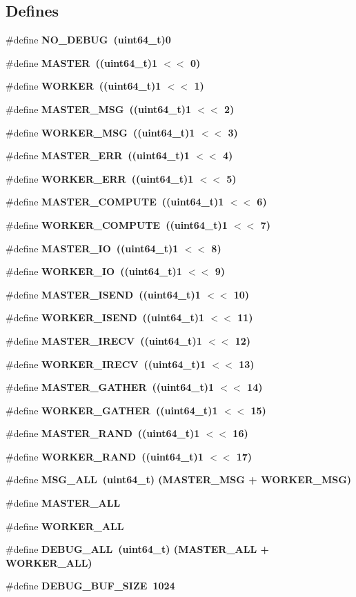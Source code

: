 \subsection*{Defines}
\begin{CompactItemize}
\item 
\#define \bf{NO\_\-DEBUG}~(uint64\_\-t)0
\item 
\#define \bf{MASTER}~((uint64\_\-t)1 $<$$<$ 0)
\item 
\#define \bf{WORKER}~((uint64\_\-t)1 $<$$<$ 1)
\item 
\#define \bf{MASTER\_\-MSG}~((uint64\_\-t)1 $<$$<$ 2)
\item 
\#define \bf{WORKER\_\-MSG}~((uint64\_\-t)1 $<$$<$ 3)
\item 
\#define \bf{MASTER\_\-ERR}~((uint64\_\-t)1 $<$$<$ 4)
\item 
\#define \bf{WORKER\_\-ERR}~((uint64\_\-t)1 $<$$<$ 5)
\item 
\#define \bf{MASTER\_\-COMPUTE}~((uint64\_\-t)1 $<$$<$ 6)
\item 
\#define \bf{WORKER\_\-COMPUTE}~((uint64\_\-t)1 $<$$<$ 7)
\item 
\#define \bf{MASTER\_\-IO}~((uint64\_\-t)1 $<$$<$ 8)
\item 
\#define \bf{WORKER\_\-IO}~((uint64\_\-t)1 $<$$<$ 9)
\item 
\#define \bf{MASTER\_\-ISEND}~((uint64\_\-t)1 $<$$<$ 10)
\item 
\#define \bf{WORKER\_\-ISEND}~((uint64\_\-t)1 $<$$<$ 11)
\item 
\#define \bf{MASTER\_\-IRECV}~((uint64\_\-t)1 $<$$<$ 12)
\item 
\#define \bf{WORKER\_\-IRECV}~((uint64\_\-t)1 $<$$<$ 13)
\item 
\#define \bf{MASTER\_\-GATHER}~((uint64\_\-t)1 $<$$<$ 14)
\item 
\#define \bf{WORKER\_\-GATHER}~((uint64\_\-t)1 $<$$<$ 15)
\item 
\#define \bf{MASTER\_\-RAND}~((uint64\_\-t)1 $<$$<$ 16)
\item 
\#define \bf{WORKER\_\-RAND}~((uint64\_\-t)1 $<$$<$ 17)
\item 
\#define \bf{MSG\_\-ALL}~(uint64\_\-t) (MASTER\_\-MSG + WORKER\_\-MSG)
\item 
\#define \bf{MASTER\_\-ALL}
\item 
\#define \bf{WORKER\_\-ALL}
\item 
\#define \bf{DEBUG\_\-ALL}~(uint64\_\-t) (MASTER\_\-ALL + WORKER\_\-ALL)
\item 
\#define \bf{DEBUG\_\-BUF\_\-SIZE}~1024
\end{CompactItemize}
